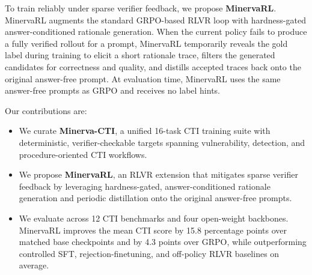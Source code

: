 To train reliably under sparse verifier feedback, we propose \textbf{MinervaRL}. MinervaRL augments the standard GRPO-based RLVR loop with hardness-gated answer-conditioned rationale generation. When the current policy fails to produce a fully verified rollout for a prompt, MinervaRL temporarily reveals the gold label during training to elicit a short rationale trace, filters the generated candidates for correctness and quality, and distills accepted traces back onto the original answer-free prompt. At evaluation time, MinervaRL uses the same answer-free prompts as GRPO and receives no label hints.

Our contributions are:
\begin{itemize}
  \item We curate \textbf{Minerva-CTI}, a unified 16-task CTI training suite with deterministic, verifier-checkable targets spanning vulnerability, detection, and procedure-oriented CTI workflows.
  \item We propose \textbf{MinervaRL}, an RLVR extension that mitigates sparse verifier feedback by leveraging hardness-gated, answer-conditioned rationale generation and periodic distillation onto the original answer-free prompts.
  \item We evaluate across 12 CTI benchmarks and four open-weight backbones. MinervaRL improves the mean CTI score by 15.8 percentage points over matched base checkpoints and by 4.3 points over GRPO, while outperforming controlled SFT, rejection-finetuning, and off-policy RLVR baselines on average.
\end{itemize}
